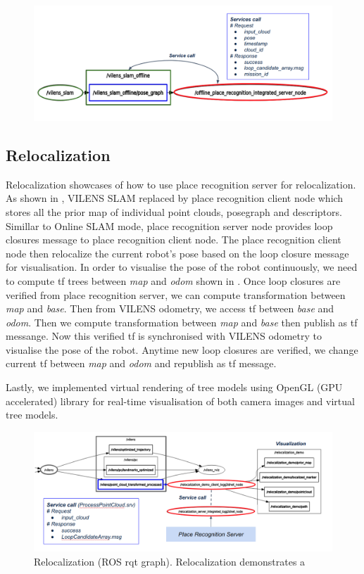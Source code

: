 \begin{figure}[t]
  \centering
  \includegraphics[width=0.99\columnwidth]{pics/Implementation_Offline_SLAM.png}
  \caption{}
  \label{fig:implementation_offline_slam}
\end{figure}


\subsection{Relocalization}
Relocalization showcases of how to use place recognition server for relocalization. As shown in , VILENS SLAM replaced by place recognition client node which stores all the prior map of individual point clouds, posegraph and descriptors. Simillar to Online SLAM mode, place recognition server node provides loop closures message to place recognition client node. The place recognition client node then relocalize the current robot's pose based on the loop closure message for visualisation. 
In order to visualise the pose of the robot continuously, we need to compute tf trees between \emph{map} and \emph{odom} shown in . Once loop closures are verified from place recognition server, we can compute transformation between \emph{map} and \emph{base}. Then from VILENS odometry, we access tf between \emph{base} and \emph{odom}. Then we compute transformation between \emph{map} and \emph{base} then publish as tf messange. Now this verified tf is synchronised with VILENS odometry to visualise the pose of the robot. Anytime new loop closures are verified, we change current tf between \emph{map} and \emph{odom} and republish as tf message. 

Lastly, we implemented virtual rendering of tree models using OpenGL (GPU accelerated) library for real-time visualisation of both camera images and virtual tree models. 
\begin{figure}[t]
  \centering
  \includegraphics[width=0.99\columnwidth]{pics/Implementation_Relocalization1.png}
  \caption{Relocalization (ROS rqt graph). Relocalization demonstrates a }
  \label{fig:implementation_relocalization}
\end{figure}



